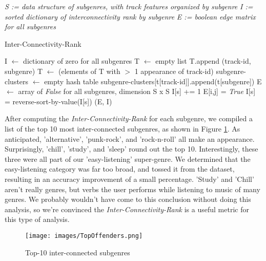 \documentclass[conference]{IEEEtran}
\begin{document}
\begin{algorithm} 
\textit{S := data structure of subgenres, with track features organized by subgenre}
\newline
\textit{I := sorted dictionary of interconnectivity rank by subgenre}
\newline
\textit{E := boolean edge matrix for all subgenres}
\newline
{}
\newline
\begin{algorithmic}[H]
\caption{Inter-Connectivity-Rank}
\STATE I $\gets$ dictionary of zero for all subgenres
\STATE T $\gets$ empty list
\STATE T.append (track-id, subgenre) 
\ENDFOR
\ENDFOR
\STATE T $\gets$ (elements of T with $>$ 1 appearance of track-id)
\STATE subgenre-clusters $\gets$ empty hash table
\STATE subgenre-clusters[t[track-id]].append(t[subgenre])
\ENDFOR
\STATE E $\gets$ array of \emph{False} for all subgenres, dimension S x S
\STATE I[s] += 1
\ENDFOR
{}
\STATE E[i,j] = \emph{True}
\ENDIF
\ENDFOR
\ENDFOR
\STATE I[s] = reverse-sort-by-value(I[s])
\RETURN (E, I)
\end{algorithmic}
\end{algorithm}

After computing the \emph{Inter-Connectivity-Rank} for each subgenre, we compiled a list of the top 10 most inter-connected subgenres, as shown in Figure \ref{fig:Ranking}. As anticipated, 'alternative', 'punk-rock', and 'rock-n-roll' all make an appearance. Surprisingly, 'chill', 'study', and 'sleep' round out the top 10. Interestingly, these three were all part of our 'easy-listening' super-genre. We determined that the easy-listening category was far too broad, and tossed it from the dataset, resulting in an accuracy improvement of a small percentage. 'Study' and 'Chill' aren't really genres, but verbs the user performs while listening to music of many genres. We probably wouldn't have come to this conclusion without doing this analysis, so we're convinced the \emph{Inter-Connectivity-Rank} is a useful metric for this type of analysis. 

\begin{figure}[htbp]
\centerline{\texttt{[image: images/TopOffenders.png]}}
\caption{Top-10 inter-connected subgenres}
\label{fig:Ranking}
\end{figure}
\end{document}
